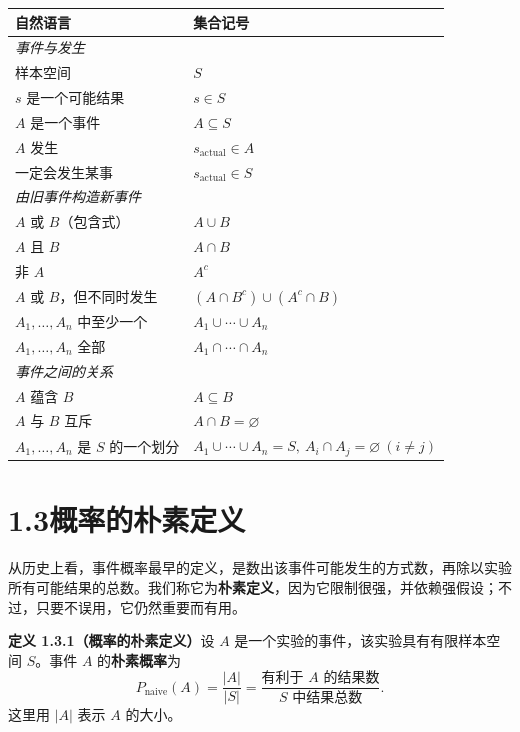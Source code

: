 \documentclass[UTF8,12pt,a4paper,fontset=fandol]{ctexart}
\begin{document}
\begin{center}
\begin{tabular}{ll}
\hline
\textbf{自然语言} & \textbf{集合记号} \\
\hline
\multicolumn{2}{l}{\textit{事件与发生}}\\
样本空间 & $S$\\
$s$ 是一个可能结果 & $s\in S$\\
$A$ 是一个事件 & $A\subseteq S$\\
$A$ 发生 & $s_{\text{actual}}\in A$\\
一定会发生某事 & $s_{\text{actual}}\in S$\\
\hline
\multicolumn{2}{l}{\textit{由旧事件构造新事件}}\\
$A$ 或 $B$（包含式） & $A\cup B$\\
$A$ 且 $B$ & $A\cap B$\\
非 $A$ & $A^c$\\
$A$ 或 $B$，但不同时发生 & $(A\cap B^c)\cup(A^c\cap B)$\\
$A_1,\ldots,A_n$ 中至少一个 & $A_1\cup\cdots\cup A_n$\\
$A_1,\ldots,A_n$ 全部 & $A_1\cap\cdots\cap A_n$\\
\hline
\multicolumn{2}{l}{\textit{事件之间的关系}}\\
$A$ 蕴含 $B$ & $A\subseteq B$\\
$A$ 与 $B$ 互斥 & $A\cap B=\varnothing$\\
$A_1,\ldots,A_n$ 是 $S$ 的一个划分 &
$A_1\cup\cdots\cup A_n=S,\ A_i\cap A_j=\varnothing\ (i\ne j)$\\
\hline
\end{tabular}
\end{center}

\section*{1.3\quad 概率的朴素定义}

从历史上看，事件概率最早的定义，是数出该事件可能发生的方式数，再除以实验所有可能结果的总数。我们称它为\textbf{朴素定义}，因为它限制很强，并依赖强假设；不过，只要不误用，它仍然重要而有用。

\noindent\textbf{定义 1.3.1（概率的朴素定义）}\quad 设 $A$ 是一个实验的事件，该实验具有有限样本空间 $S$。事件 $A$ 的\textbf{朴素概率}为
\[
  P_{\text{naive}}(A)=\frac{|A|}{|S|}
  =\frac{\text{有利于 }A\text{ 的结果数}}{S\text{ 中结果总数}}.
\]
这里用 $|A|$ 表示 $A$ 的大小。
\end{document}
